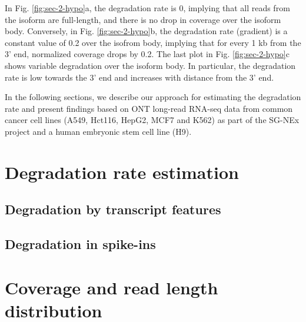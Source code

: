 In Fig. \ref{fig:sec-2-hypo}a, the degradation rate is 0, implying that all reads from the isoform are full-length, and there is no drop in coverage over the isoform body. Conversely, in Fig. \ref{fig:sec-2-hypo}b, the degradation rate (gradient) is a constant value of 0.2 over the isofrom body, implying that for every 1 kb from the 3' end, normalized coverage drops by 0.2. The last plot in Fig. \ref{fig:sec-2-hypo}c shows variable degradation over the isoform body. In particular, the degradation rate is low towards the 3' end and increases with distance from the 3' end.  

In the following sections, we describe our approach for estimating the degradation rate and present findings based on ONT long-read RNA-seq data from common cancer cell lines (A549, Hct116, HepG2, MCF7 and K562) as part of the SG-NEx project and a human embryonic stem cell line (H9). 

\section{Degradation rate estimation}

\subsection{Degradation by transcript features}

\subsection{Degradation in spike-ins}

\section{Coverage and read length distribution}


